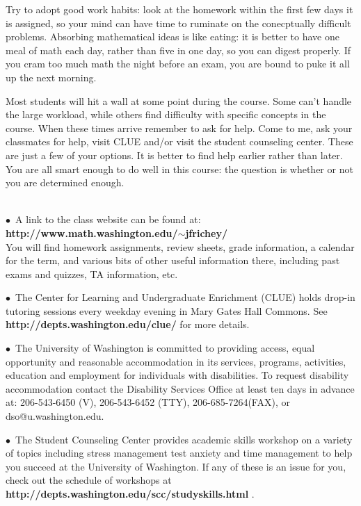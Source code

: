 \documentclass[11 pt]{report}
\begin{document}
\vspace{.2cm}

\noindent Try to adopt good work habits: look at
the homework within the first few days it is assigned, so your mind can have time to ruminate on the conecptually difficult problems.
Absorbing mathematical ideas is like eating: it is better to have one meal of math each day, rather than five in one day, so you can digest properly. If you cram too much math the night before an exam, you are bound to puke it all up the next morning.  

\vspace{.25cm}  

 Most students will hit a wall at some point
during the course.  Some can't handle the large workload, while
others find difficulty with specific concepts in the course. When
these times arrive remember to ask for help.  Come to me, ask your classmates for help, visit CLUE and/or visit the student counseling center.  These are just a
few of your options. It is better to find help earlier rather
than later. You are all smart enough to do well in this course: the
question is whether or not you are determined enough.
\vspace{0.3cm}

 \\
\noindent $\bullet$\ A link to the class website can be
found at: {\bf http://www.math.washington.edu/$\sim$jfrichey/} \\ You
will find homework assignments, review sheets, grade information, a
calendar for the term, and various bits of other useful information
there, including past exams and quizzes, TA information, etc.


\vspace{.2cm}

\noindent $\bullet$\ The Center for Learning and Undergraduate
Enrichment (CLUE) holds drop-in tutoring sessions every weekday
evening in Mary Gates Hall Commons.  See {\bf http://depts.washington.edu/clue/} for more details.

\vspace{.2cm}

\noindent $\bullet$\ The University of Washington is committed to providing
access, equal opportunity and reasonable accommodation in its
services, programs, activities, education and employment for
individuals with disabilities.  To request disability accommodation
contact the Disability Services Office at least ten days in advance
at: 206-543-6450 (V), 206-543-6452 (TTY), 206-685-7264(FAX), or
dso@u.washington.edu.

\vspace{.2cm}

\noindent $\bullet$\  The Student Counseling Center provides academic skills
workshop on a variety of topics including stress management test
anxiety and time management to help you succeed at the University of
Washington. If any of these is an issue for you, check out the
schedule of workshops at {\bf
http://depts.washington.edu/scc/studyskills.html} .
\end{document}
